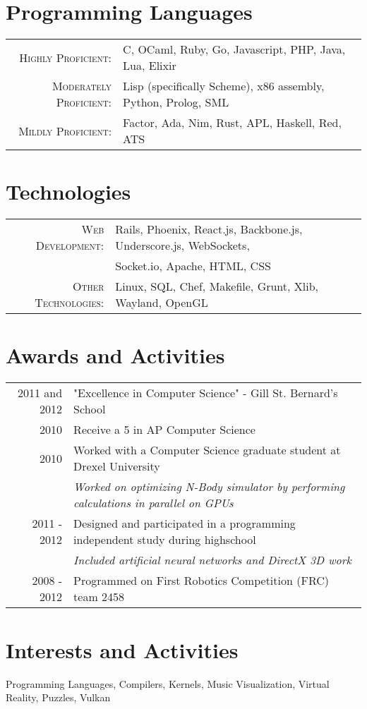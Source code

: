 \documentclass[a4paper,10pt]{article}
\begin{document}
\section{Programming Languages}
\begin{tabular}{rl}
  \textsc{Highly Proficient:}     & C, OCaml, Ruby, Go, Javascript, PHP, Java, Lua, Elixir\\
  \textsc{Moderately Proficient:} & Lisp (specifically Scheme), x86 assembly, Python, Prolog, SML\\
  \textsc{Mildly Proficient:}     & Factor, Ada, Nim, Rust, APL, Haskell, Red, ATS\\
\end{tabular}

\section{Technologies}
\begin{tabular}{rl}
  \textsc{Web Development:}    & Rails, Phoenix, React.js, Backbone.js, Underscore.js, WebSockets,\\
                               & Socket.io, Apache, HTML, CSS\\
  \textsc{Other Technologies:} & Linux, SQL, Chef, Makefile, Grunt, Xlib, Wayland, OpenGL\\
\end{tabular}

\section{Awards and Activities}
\begin{tabular}{rl}	
  2011 and 2012 & "Excellence in Computer Science" - Gill St. Bernard's School\\
  2010          & Receive a 5 in AP Computer Science\\
  2010          & Worked with a Computer Science graduate student at Drexel University\\
                & \emph{Worked on optimizing N-Body simulator by performing calculations in parallel on GPUs}\\
  2011 - 2012   & Designed and participated in a programming independent study during highschool\\
                & \emph{Included artificial neural networks and DirectX 3D work}\\
  2008 - 2012   & Programmed on First Robotics Competition (FRC) team 2458\\
\end{tabular}

\section{Interests and Activities}
Programming Languages, Compilers, Kernels, Music Visualization, Virtual Reality, Puzzles, Vulkan\\


\end{document}
